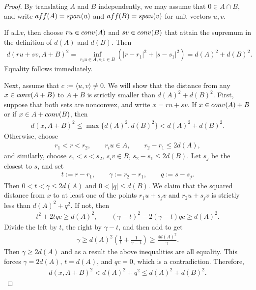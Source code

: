 \documentclass[10pt,a4paper]{amsart}
\begin{document}
\begin{proof}
    By translating $A$ and $B$ independently, we may assume that $0\in A\cap B$, and write $\textup{aff}(A)=\textup{span}(u)$ and $\textup{aff}(B)=\textup{span}(v)$ for unit vectors $u,v$.

    If $u\bot v$, then choose $ru\in \textup{conv}(A)$ and $sv\in \textup{conv}(B)$ that attain the supremum in the definition of $d(A)$ and $d(B)$. Then
    \begin{align*}
        d(ru+sv,A+B)^2=\inf_{r_1u\in A,s_1v\in B}(|r-r_1|^2+|s-s_1|^2)=d(A)^2+d(B)^2.
    \end{align*}
    Equality follows immediately.

    Next, assume that $c:=\langle u,v\rangle \neq 0$. We will show that the distance from any $x\in \textup{conv}(A+B)$ to $A+B$ is strictly smaller than $d(A)^2+d(B)^2$. First, suppose that both sets are nonconvex, and write $x=ru+sv$. If $x\in \textup{conv}(A)+B$ or if $x\in A+\textup{conv}(B)$, then
    \begin{align*}
        d(x,A+B)^2\leq \max\{d(A)^2,d(B)^2\}<d(A)^2+d(B)^2.
    \end{align*}
    Otherwise, choose
    \begin{align*}
        r_1<r<r_2,\qquad r_iu\in A,\qquad r_2-r_1\leq 2d(A),
    \end{align*}
    and similarly, choose $s_1< s< s_2$, $s_iv\in B$, $s_2-s_1\leq 2d(B)$. Let $s_j$ be the closest to $s$, and set
    \begin{align*}
        t:=r-r_1,\qquad \gamma:=r_2-r_1,\qquad q:=s-s_j.
    \end{align*}
    Then $0<t<\gamma \leq 2d(A)$ and $0<|q|\leq d(B)$. We claim that the squared distance from $x$ to at least one of the points $r_1u+s_jv$ and $r_2u+s_jv$ is strictly less than $d(A)^2+q^2$. If not, then
    \begin{align*}
        t^2+2tqc\geq d(A)^2,\qquad (\gamma-t)^2-2(\gamma-t)qc\geq d(A)^2.
    \end{align*}
    Divide the left by $t$, the right by $\gamma-t$, and then add to get
    \begin{align*}
        \gamma\geq d(A)^2\left(\frac{1}{t}+\frac{1}{\gamma-t}\right)\geq\frac{4d(A)^2}{\gamma}.
    \end{align*}
    Then $\gamma\geq 2d(A)$ and as a result the above inequalities are all equality. This forces $\gamma=2d(A)$, $t=d(A)$, and $qc=0$, which is a contradiction. Therefore,
    \begin{align*}
        d(x,A+B)^2<d(A)^2+q^2\leq d(A)^2+d(B)^2.
    \end{align*}


\end{proof}
\end{document}
